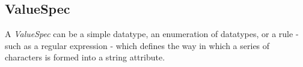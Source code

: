 \subsection{ValueSpec}
A \emph{ValueSpec} can be a simple datatype, an enumeration of datatypes, or a rule - such as a regular expression - which defines the way in which a series of characters is formed into a string attribute. 







 




